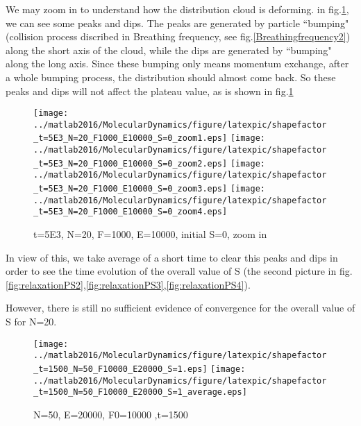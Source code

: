 \documentclass[a4paper,onecolumn,12pt]{article}
\begin{document}
We may zoom in to understand how the distribution cloud is deforming. 
in fig.\ref{fig:relaxationPS5}, we can see some peaks and dips. The peaks are generated by particle ``bumping" (collision process discribed in Breathing frequency, see fig.\ref{Breathingfrequency2}) along the short axis of the cloud, while the dips are generated by ``bumping" along the long axis. Since these bumping only means momentum exchange, after a whole bumping process, the distribution should almost come back. So these peaks and dips will not affect the plateau value, as is shown in fig.\ref{fig:relaxationPS5}
\begin{figure}[hbtp]
\centering
\texttt{[image: ../matlab2016/MolecularDynamics/figure/latexpic/shapefactor\_t=5E3\_N=20\_F1000\_E10000\_S=0\_zoom1.eps]}
\texttt{[image: ../matlab2016/MolecularDynamics/figure/latexpic/shapefactor\_t=5E3\_N=20\_F1000\_E10000\_S=0\_zoom2.eps]} 
\texttt{[image: ../matlab2016/MolecularDynamics/figure/latexpic/shapefactor\_t=5E3\_N=20\_F1000\_E10000\_S=0\_zoom3.eps]} 
\texttt{[image: ../matlab2016/MolecularDynamics/figure/latexpic/shapefactor\_t=5E3\_N=20\_F1000\_E10000\_S=0\_zoom4.eps]} 
\caption{t=5E3, N=20, F=1000, E=10000, initial S=0, zoom in}
\label{fig:relaxationPS5}
\end{figure}

In view of this, we take average of a short time to clear this peaks and dips in order to see the time evolution of the overall value of S (the second picture in fig.\ref{fig:relaxationPS2},\ref{fig:relaxationPS3},\ref{fig:relaxationPS4}).

However, there is still no sufficient evidence of convergence for the overall value of S for N=20. 
\begin{figure}[hbtp]

\centering
\texttt{[image: ../matlab2016/MolecularDynamics/figure/latexpic/shapefactor\_t=1500\_N=50\_F10000\_E20000\_S=1.eps]}
\texttt{[image: ../matlab2016/MolecularDynamics/figure/latexpic/shapefactor\_t=1500\_N=50\_F10000\_E20000\_S=1\_average.eps]} 
\caption{N=50, E=20000, F0=10000 ,t=1500}
\label{fig:relaxationPS6}
\end{figure}
\end{document}

